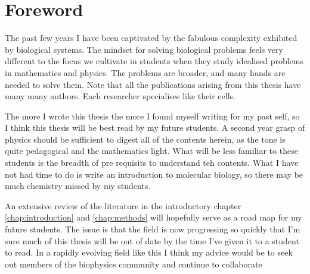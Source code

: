 \chapter*{Foreword}
\setcounter{page}{1}
\label{chap:foreward}
\chapquote{} {}
\vspace
The past few years I have been captivated by the fabulous complexity exhibited by biological systems. The mindset for solving biological problems feels very different to the focus we cultivate in students when they study idealised problems in mathematics and physics. The problems are broader, and many hands are needed to solve them. Note that all the publications arising from this thesis have many many authors. Each researcher specialises like their cells.

The more I wrote this thesis the more I found myself writing for my past self, so I think this thesis will be best read by my future students. A second year grasp of physics should be sufficient to digest all of the contents herein, as the tone is quite pedagogical and the mathematics light. What will be less familiar to these students is the breadth of pre requisits to understand teh contents. What I have not had time to do is write an introduction to molecular biology, so there may be much chemistry missed by my students.

An extensive review of the literature in the introductory chapter \ref{chap:introduction} and \ref{chap:methods} will hopefully serve as a road map for my future students. The issue is that the field is now progressing so quickly that I'm sure much of this thesis will be out of date by the time I've given it to a student to read. In a rapidly evolving field like this I think my advice would be to seek out members of the biophysics community and continue to collaborate

